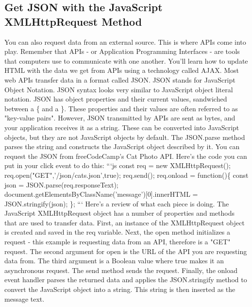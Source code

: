 \documentclass{article}%
\begin{document}
\subsection{Get JSON with the JavaScript XMLHttpRequest Method}%
\label{subsec:GetJSONwiththeJavaScriptXMLHttpRequestMethod}%
You can also request data from an external source. This is where APIs come into play.\newline%
Remember that APIs {-} or Application Programming Interfaces {-} are tools that computers use to communicate with one another. You'll learn how to update HTML with the data we get from APIs using a technology called AJAX.\newline%
Most web APIs transfer data in a format called JSON. JSON stands for JavaScript Object Notation.\newline%
JSON syntax looks very similar to JavaScript object literal notation. JSON has object properties and their current values, sandwiched between a \{ and a \}.\newline%
These properties and their values are often referred to as "key{-}value pairs".\newline%
However, JSON transmitted by APIs are sent as bytes, and your application receives it as a string. These can be converted into JavaScript objects, but they are not JavaScript objects by default. The JSON.parse method parses the string and constructs the JavaScript object described by it.\newline%
You can request the JSON from freeCodeCamp's Cat Photo API. Here's the code you can put in your click event to do this:\newline%
```js\newline%
const req = new XMLHttpRequest();\newline%
req.open("GET",'/json/cats.json',true);\newline%
req.send();\newline%
req.onload = function()\{\newline%
  const json = JSON.parse(req.responseText);\newline%
  document.getElementsByClassName('message'){[}0{]}.innerHTML = JSON.stringify(json);\newline%
\};\newline%
```\newline%
Here's a review of what each piece is doing. The JavaScript XMLHttpRequest object has a number of properties and methods that are used to transfer data. First, an instance of the XMLHttpRequest object is created and saved in the req variable.\newline%
Next, the open method initializes a request {-} this example is requesting data from an API, therefore is a "GET" request. The second argument for open is the URL of the API you are requesting data from. The third argument is a Boolean value where true makes it an asynchronous request.\newline%
The send method sends the request. Finally, the onload event handler parses the returned data and applies the JSON.stringify method to convert the JavaScript object into a string. This string is then inserted as the message text.\newline%
\end{document}
